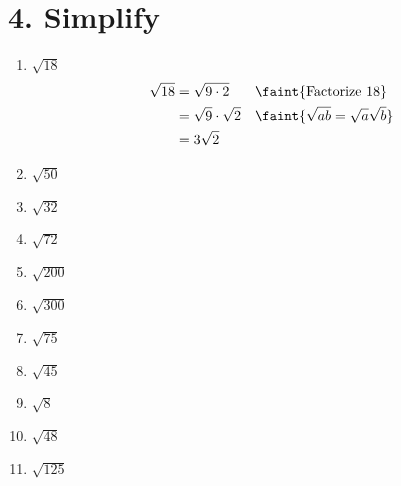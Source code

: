 \documentclass{hw}
\begin{document}
\begin{center}
\end{center}
    
\section*{\normalsize 4. Simplify}
\begin{enumerate}[label=\alph*.]
    \item $\sqrt{18}$
        \textcolor{blue}{
        \begin{align*}
        \sqrt{18} &= \sqrt{9 \cdot 2} && \faint{\text{Factorize } 18} \\
                    &= \sqrt{9} \cdot \sqrt{2} && \faint{\sqrt{ab} = \sqrt{a}\sqrt{b}} \\
                    &= 3 \sqrt{2}
        \end{align*}
        }
    \item $\sqrt{50}$
        \studentxlargeworkspace
    \item $\sqrt{32}$
        \studentxlargeworkspace
    \item $\sqrt{72}$
        \studentxlargeworkspace
    \item $\sqrt{200}$
        \studentxlargeworkspace
    \item $\sqrt{300}$
        \studentxlargeworkspace
    \item $\sqrt{75}$
        \studentxlargeworkspace
    \item $\sqrt{45}$
        \studentxlargeworkspace
    \item $\sqrt{8}$
        \studentxlargeworkspace
    \item $\sqrt{48}$
        \studentxlargeworkspace
    \item $\sqrt{125}$
        \studentxlargeworkspace
\end{enumerate}
\end{document}
